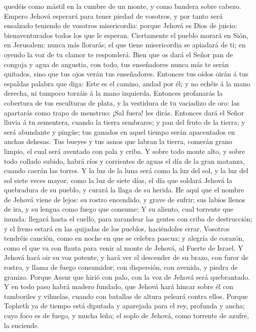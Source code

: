 quedéis como mástil en la cumbre de un monte, y como bandera sobre
cabezo.  Empero Jehová esperará para tener piedad de
vosotros, y por tanto será ensalzado teniendo de vosotros misericordia:
porque Jehová es Dios de juicio: bienaventurados todos los que le
esperan.  Ciertamente el pueblo morará en Sión, en
Jerusalem: nunca más llorarás; el que tiene misericordia se apiadará de
ti; en oyendo la voz de tu clamor te responderá.  Bien
que os dará el Señor pan de congoja y agua de angustia, con todo, tus
enseñadores nunca más te serán quitados, sino que tus ojos verán tus
enseñadores.  Entonces tus oídos oirán á tus espaldas
palabra que diga: Este es el camino, andad por él; y no echéis á la mano
derecha, ni tampoco torzáis á la mano izquierda. 
Entonces profanarás la cobertura de tus esculturas de plata, y la
vestidura de tu vaciadizo de oro: las apartarás como trapo de menstruo:
¡Sal fuera! les dirás.  Entonces dará el Señor lluvia á
tu sementera, cuando la tierra sembrares; y pan del fruto de la tierra;
y será abundante y pingüe; tus ganados en aquel tiempo serán apacentados
en anchas dehesas.  Tus bueyes y tus asnos que labran la
tierra, comerán grano limpio, el cual será aventado con pala y criba.
 Y sobre todo monte alto, y sobre todo collado subido,
habrá ríos y corrientes de aguas el día de la gran matanza, cuando
caerán las torres.  Y la luz de la luna será como la luz
del sol, y la luz del sol siete veces mayor, como la luz de siete días,
el día que soldará Jehová la quebradura de su pueblo, y curará la llaga
de su herida.  He aquí que el nombre de Jehová viene de
lejos: su rostro encendido, y grave de sufrir; sus labios llenos de ira,
y su lengua como fuego que consume;  Y su aliento, cual
torrente que inunda: llegará hasta el cuello, para zarandear las gentes
con criba de destrucción; y el freno estará en las quijadas de los
pueblos, haciéndoles errar.  Vosotros tendréis canción,
como en noche en que se celebra pascua; y alegría de corazón, como el
que va con flauta para venir al monte de Jehová, al Fuerte de Israel.
 Y Jehová hará oir su voz potente, y hará ver el
descender de su brazo, con furor de rostro, y llama de fuego consumidor;
con dispersión, con avenida, y piedra de granizo.  Porque
Assur que hirió con palo, con la voz de Jehová será quebrantado.
 Y en todo paso habrá madero fundado, que Jehová hará
hincar sobre él con tamboriles y vihuelas, cuando con batallas de altura
peleará contra ellos.  Porque Topheth ya de tiempo está
diputada y aparejada para el rey, profunda y ancha; cuyo foco es de
fuego, y mucha leña; el soplo de Jehová, como torrente de azufre, la
enciende.


